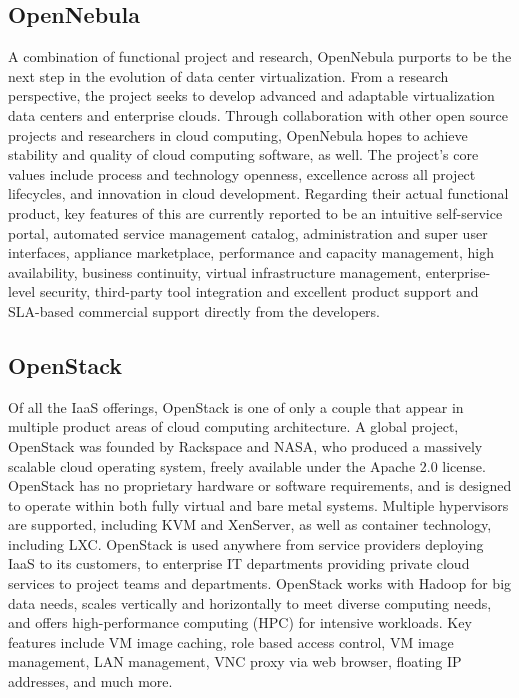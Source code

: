    
        \subsection{OpenNebula}
        
        \par A combination of functional project and research, OpenNebula purports to be the next step in the evolution of data center virtualization. From a research perspective, the project seeks to develop advanced and adaptable virtualization data centers and enterprise clouds. Through collaboration with other open source projects and researchers in cloud computing, OpenNebula hopes to achieve stability and quality of cloud computing software, as well. The project's core values include process and technology openness, excellence across all project lifecycles, and innovation in cloud development. Regarding their actual functional product, key features of this are currently reported to be an intuitive self-service portal, automated service management catalog, administration and super user interfaces, appliance marketplace, performance and capacity management, high availability, business continuity, virtual infrastructure management, enterprise-level security, third-party tool integration and excellent product support and SLA-based commercial support directly from the developers.
    
        \subsection{OpenStack}
        
        \par Of all the IaaS offerings, OpenStack is one of only a couple that appear in multiple product areas of cloud computing architecture. A global project, OpenStack was founded by Rackspace and NASA, who produced a massively scalable cloud operating system, freely available under the Apache 2.0 license. OpenStack has no proprietary hardware or software requirements, and is designed to operate within both fully virtual and bare metal systems. Multiple hypervisors are supported, including KVM and XenServer, as well as container technology, including LXC. OpenStack is used anywhere from service providers deploying IaaS to its customers, to enterprise IT departments providing private cloud services to project teams and departments. OpenStack works with Hadoop for big data needs, scales vertically and horizontally to meet diverse computing needs, and offers high-performance computing (HPC) for intensive workloads. Key features include VM image caching, role based access control, VM image management, LAN management, VNC proxy via web browser, floating IP addresses, and much more.